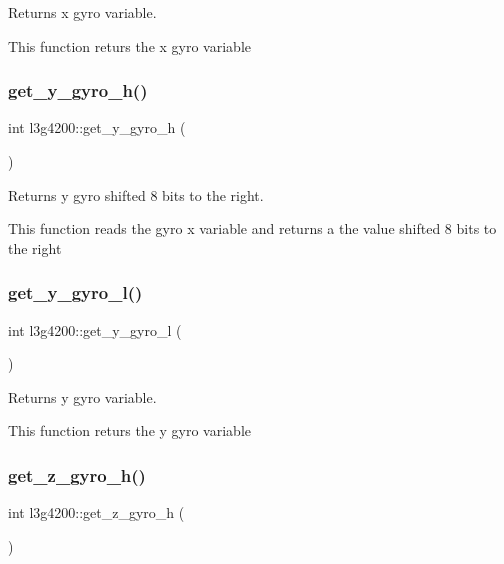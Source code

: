 Returns x gyro variable. 

This function returs the x gyro variable \mbox{\label{classl3g4200_a6c4d995bc9be83ae30d884d0dec95960}} 
\subsubsection{\texorpdfstring{get\+\_\+y\+\_\+gyro\+\_\+h()}{get\_y\_gyro\_h()}}
{\footnotesize\ttfamily int l3g4200\+::get\+\_\+y\+\_\+gyro\+\_\+h (\begin{DoxyParamCaption}{ }\end{DoxyParamCaption})\hspace{0.3cm}{\ttfamily [inline]}}



Returns y gyro shifted 8 bits to the right. 

This function reads the gyro x variable and returns a the value shifted 8 bits to the right \mbox{\label{classl3g4200_afb369dc33500b9ef4d32a1f35c066448}} 
\subsubsection{\texorpdfstring{get\+\_\+y\+\_\+gyro\+\_\+l()}{get\_y\_gyro\_l()}}
{\footnotesize\ttfamily int l3g4200\+::get\+\_\+y\+\_\+gyro\+\_\+l (\begin{DoxyParamCaption}{ }\end{DoxyParamCaption})\hspace{0.3cm}{\ttfamily [inline]}}



Returns y gyro variable. 

This function returs the y gyro variable \mbox{\label{classl3g4200_a48ea66d624cf6147656e65b5ba0e3314}} 
\subsubsection{\texorpdfstring{get\+\_\+z\+\_\+gyro\+\_\+h()}{get\_z\_gyro\_h()}}
{\footnotesize\ttfamily int l3g4200\+::get\+\_\+z\+\_\+gyro\+\_\+h (\begin{DoxyParamCaption}{ }\end{DoxyParamCaption})\hspace{0.3cm}{\ttfamily [inline]}}



